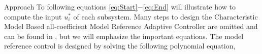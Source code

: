 \begin{section}{Approach}
To following equations \eqref{eq:Start}$-$\eqref{eq:End} will illustrate how to compute the input $u^*_i$ of each subsystem. Many steps to design the Characteristic Model Based all-coefficient Model Reference Adaptive Controller are omitted and can be found in \cite{tao2003adaptive,Goodwin1643720}, but we will emphasize the important equations. The model reference control is designed by solving the following polynomial equation,

\end{section}
